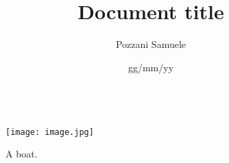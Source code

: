 \documentclass{article}
\title{Document title}
\date{gg/mm/yy}
\author{Pozzani Samuele}
\begin{document}
	\maketitle
	\newpage
		\section{}
			\subsection{}
				\subsubsection{}
					\paragraph{}
						\subparagraph{}
				
	\begin{equation*}

		\begin{align*}
		\end{align*}

		\begin{matrix}
		\end{matrix}
	
	\end{equation*}

	\begin{figure}[h!]

		\texttt{[image: image.jpg]}
		\caption{A boat.}
		\label{fig:image_1}

	\end{figure}
\end{document}
